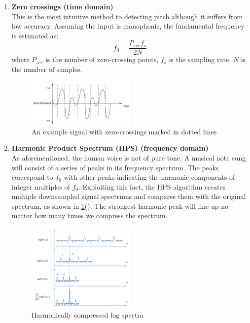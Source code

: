 \begin{enumerate}
    \item \textbf{Zero crossings (time domain)}\\
    This is the most intuitive method to detecting pitch although it suffers from low accuracy.
    Assuming the input is monophonic, the fundamental frequency is estimated as:
    \[f_0 = \frac{P_{zcr}f_s}{2N}\]
    where $P_{zcr}$ is the number of zero-crossing points, $f_s$ is the sampling rate,
    $N$ is the number of samples.
    \begin{figure}[h]
        \centering
        \includegraphics[width=0.5\textwidth]{Figures/zcr.png}
        \caption[An example signal with zero-crossings marked in dotted lines]{An example signal with zero-crossings marked in dotted lines}
    \end{figure}
    \item \textbf{Harmonic Product Spectrum (HPS) (frequency domain)}\\
    As aforementioned, the human voice is not of pure tone. A musical note sung will consist of a series of peaks in its frequency spectrum. The peaks correspond to $f_0$ with other peaks indicating the harmonic components of integer multiples of $f_0$. 
    Exploiting this fact, the HPS algorithm creates multiple downsampled signal spectrums and compares them with the original spectrum, as shown in 
    \cref{HPS}(\cite{ias}).
    The strongest harmonic peak will line up no matter how many times we compress the spectrum.
    
    \begin{figure}[h]
        \centering
        \includegraphics[width=0.5\textwidth]{Figures/HPS.png}
        \caption{Harmonically compressed log spectra}
        \label{HPS}
    \end{figure}
    

\end{enumerate}
